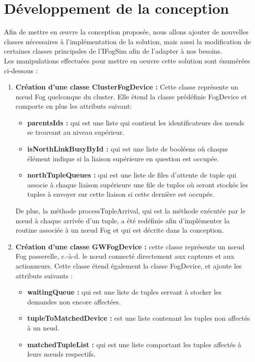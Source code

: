 \section{Développement de la conception}
Afin de mettre en œuvre la conception proposée, nous allons ajouter de nouvelles classes nécessaires à l'implémentation de la solution, mais aussi la modification de certaines classes principales de l'IFogSim afin de l'adapter à nos besoins.\\
Les manipulations effectuées pour mettre en oeuvre cette solution sont énumérées ci-dessous : 
\begin{enumerate}
    \item \textbf{Création d'une classe ClusterFogDevice :} Cette classe représente un nœud Fog quelconque du cluster. Elle étend la classe prédéfinie FogDevice et comporte en plus les attributs suivant:
\begin{itemize}
    \item \textbf{parentsIds :} qui est une liste qui contient les identificateurs des nœuds se trouvant au niveau supérieur.
    \item \textbf{isNorthLinkBusyById :} qui est une liste de booléens où chaque élément indique si la liaison supérieure en question est occupée.
    \item \textbf{northTupleQueues :} qui est une liste de files d'attente de tuple qui associe à chaque liaison supérieure une file de tuples où seront stockés les tuples à envoyer sur cette liaison si cette dernière est occupée.
\end{itemize}
De plus, la méthode  processTupleArrival, qui est la méthode exécutée par le nœud à chaque arrivée d'un tuple, a été redéfinie afin d'implémenter la routine associée à un nœud Fog et qui est décrite dans la conception.
     \item \textbf{Création d'une classe GWFogDevice :} cette classe représente un nœud Fog passerelle, c.-à-d. le nœud connecté directement aux capteurs et aux actionneurs. Cette classe étend également la classe FogDevice, et ajoute les attributs suivants :
     \begin{itemize}
     \item \textbf{waitingQueue :} qui est une liste de tuples servant à stocker les demandes non encore affectées.
     \item \textbf{tupleToMatchedDevice :} est une liste contenant les tuples non affectés à un neud.
     \item \textbf{matchedTupleList :} qui est une liste comportant les tuples affectés à leurs nœuds respectifs.

\end{itemize}
\end{enumerate}
